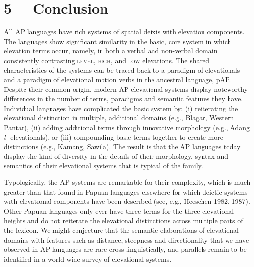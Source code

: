 \section[5 \ \ Conclusion]{5 \ \ Conclusion}
All AP languages have rich systems of spatial deixis with elevation components. The languages show significant similarity in the basic, core system in which elevation terms occur, namely, in both a verbal and non-verbal domain consistently contrasting \textsc{level, high, }and \textsc{low }elevations. The shared characteristics of the systems can be traced back to a paradigm of elevationals and a paradigm of elevational motion verbs in the ancestral language, pAP. Despite their common origin, modern AP elevational systems display noteworthy differences in the number of terms, paradigms and semantic features they have. Individual languages have complicated the basic system by: (i) reiterating the elevational distinction in multiple, additional domains (e.g., Blagar, Western Pantar), (ii) adding additional terms through innovative morphology (e.g., Adang \textit{l}\textit{{\textepsilon}}\textit{{}-} elevationals), or (iii) compounding basic terms together to create more distinctions (e.g., Kamang, Sawila). The 
result is that the AP languages today display the kind of diversity in the details of their morphology, syntax and semantics of their elevational systems that is typical of the family.

Typologically, the AP systems are remarkable for their complexity, which is much greater than that found in Papuan languages elsewhere for which deictic systems with elevational components have been described (see, e.g., Heeschen 1982, 1987). Other Papuan languages only ever have three terms for the three elevational heights and do not reiterate the elevational distinctions across multiple parts of the lexicon. We might conjecture that the semantic elaborations of elevational domains with features such as distance, steepness and directionality that we have observed in AP languages are rare cross-linguistically, and parallels remain to be identified in a world-wide survey of elevational systems. 

